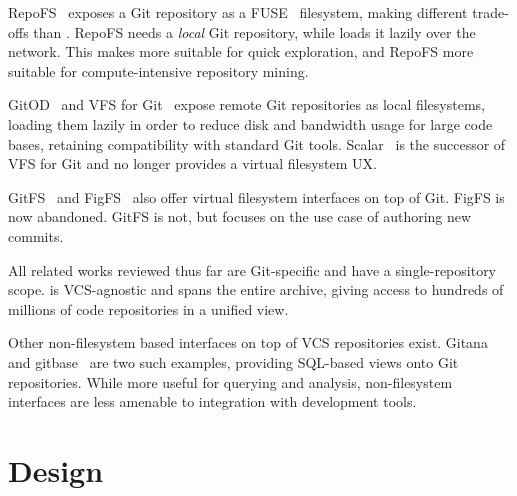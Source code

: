 RepoFS~\cite{spinellis2019repofs} exposes a Git repository as a
FUSE~\cite{fuse, vangoor2017fuseperf} filesystem, making different trade-offs
than \SWHFS{}. RepoFS needs a \emph{local} Git repository, while \SWHFS{} loads
it lazily over the network. This makes \SWHFS{} more suitable for quick
exploration, and RepoFS more suitable for compute-intensive repository mining.

GitOD~\cite{schroeder2012gitod} and VFS for Git~\cite{msvfsforgit} expose
remote Git repositories as local filesystems, loading them lazily in order to
reduce disk and bandwidth usage for large code bases, retaining compatibility
with standard Git tools.
Scalar~\cite{msscalar} is the successor of VFS for Git and no longer provides
a virtual filesystem UX.

GitFS~\cite{presslabs-gitfs} and FigFS~\cite{grant2009figfs} also offer virtual
filesystem interfaces on top of Git. FigFS is now abandoned. GitFS is not, but
focuses on the use case of authoring new commits.

All related works reviewed thus far are Git-specific and have a
single-repository scope. \SWHFS{} is VCS-agnostic and spans the entire \SWH{}
archive, giving access to hundreds of millions of code repositories in a
unified view.

Other non-filesystem based interfaces on top of VCS repositories exist.
Gitana~\cite{cosentino2018gitana} and gitbase~\cite{sourced-gitbase} are two
such examples, providing SQL-based views onto Git repositories. While more
useful for querying and analysis, non-filesystem interfaces are less amenable
to integration with development tools.

\section{Design}


